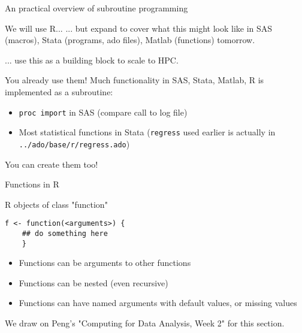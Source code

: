 \documentclass[xcolor=table,compress]{beamer}
\begin{document}
\begin{frame}{An practical overview of subroutine programming}
\begin{block}{We will use R...}
... but expand to cover what this might look like in SAS (macros), Stata (programs, ado files), Matlab (functions) tomorrow.

... use this as a building block to scale to HPC.
\end{block}
\end{frame}



\begin{frame}
\begin{block}{You already use them!}
Much functionality in SAS, Stata, Matlab, R is implemented as a subroutine:
\begin{itemize}
\item \texttt{proc import} in SAS (compare call to log file)
\item Most statistical functions in Stata (\texttt{regress} used earlier is actually in \texttt{../ado/base/r/regress.ado})
\end{itemize}
\end{block}
You can create them too!
\end{frame}


\begin{frame}[fragile]{Functions in R}
\begin{block}{R objects of class "function"}
\lstset{language=R}
\begin{lstlisting}
f <- function(<arguments>) {
	## do something here
	}
\end{lstlisting}
\begin{itemize}
\item Functions can be arguments to other functions
\item Functions can be nested (even recursive)
\item Functions can have named arguments with default values, or missing values
\end{itemize}
\end{block}
\vfill
\tiny We draw on Peng's "Computing for Data Analysis, Week 2" for this section.
\end{frame}

\lstset{language=R}
\end{document}
